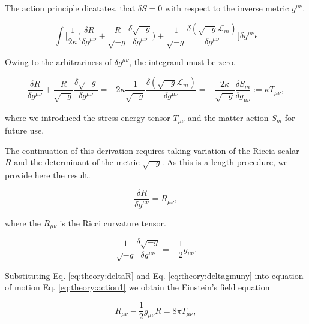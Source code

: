 The action principle dicatates, that $\delta S = 0$  with respect to the inverse metric $g^{\mu\nu}$. 

\begin{equation}
\int\Bigg[\frac{1}{2\kappa}\Big(\frac{\delta R}{\delta g^{\mu\nu}}+\frac{R}{\sqrt{-g}}\frac{\delta\sqrt{-g}}{\delta g^{\mu\nu}}\Big) + \frac{1}{\sqrt{-g}}\frac{\delta(\sqrt{-g}\mathcal{L}_m)}{\delta g^{\mu\nu}}\Bigg]\delta g^{\mu\nu}\epsilon
\end{equation}

Owing to the arbitrariness of $\delta g^{\mu\nu}$, the integrand must be zero. 

\begin{equation}
\frac{\delta R}{\delta g^{\mu\nu}} + \frac{R}{\sqrt{-g}}\frac{\delta\sqrt{-g}}{\delta g^{\mu\nu}} = -2\kappa\frac{1}{\sqrt{-g}}\frac{\delta(\sqrt{-g}\mathcal{L}_m)}{\delta g^{\mu\nu}} = -\frac{2\kappa}{\sqrt{-g}}\frac{\delta S_m}{\delta g_{\mu\nu}} := \kappa T_{\mu\nu},
\label{eq:theory:action1}
\end{equation}

where we introduced the stress-energy tensor $T_{\mu\nu}$ and the matter action $S_m$ for future use. \\


The continuation of this derivation requires taking variation of the Riccia scalar $R$ and the determinant of the metric $\sqrt{-g}$. 
As this is a length procedure, we provide here the result. 

\begin{equation}
\frac{\delta R}{\delta g^{\mu\nu}} = R_{\mu\nu},
\label{eq:theory:deltaR}
\end{equation}

where the $R_{\mu\nu}$ is the Ricci curvature tensor.

\begin{equation}
\frac{1}{\sqrt{-g}}\frac{\delta\sqrt{-g}}{\delta g^{\mu\nu}} = -\frac{1}{2}g_{\mu\nu}.
\label{eq:theory:deltagmuny}
\end{equation}

Substituting Eq. \ref{eq:theory:deltaR} and Eq. \ref{eq:theory:deltagmuny} into equation of motion Eq.  \ref{eq:theory:action1} we obtain the Einstein's field equation 

\begin{equation}
R_{\mu\nu} -\frac{1}{2}g_{\mu\nu}R=8\pi T_{\mu\nu},
\label{eq:theory:EFE}
\end{equation}

